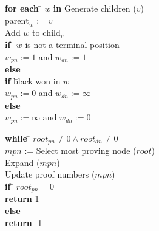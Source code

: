 \documentclass{article}
\begin{document}
\begin{samepage}
\begin{algorithm}[Expand ($v$)]
\hfill\par
\begin{tabbing}
  \textbf{for each} \= $w$ \textbf{in} Generate children ($v$)\\
  \> $\text{parent}_w$ := $v$\\
  \> Add $w$ to $\text{child}_v$\\
  \> \textbf{if} \= $w$ is not a terminal position\\
  \> \> $w_{pn} := 1$ and $w_{dn} := 1$\\
  \> \textbf{else}\\
  \> \> \textbf{if} \= black won in $w$\\
  \> \> \> $w_{pn} := 0$ and $w_{dn} := \infty$\\
  \> \> \textbf{else}\\
  \> \> \> $w_{pn} := \infty$ and $w_{dn} := 0$\\
\end{tabbing}
\end{algorithm}
\end{samepage}

\begin{samepage}
\begin{algorithm}
\hfill\par
\begin{tabbing}
  \textbf{while} \= $root_{pn} \not= 0 \land root_{dn} \not= 0$\\
  \> $mpn$ := Select most proving node ($root$) \\
  \> Expand ($mpn$)\\
  \> Update proof numbers ($mpn$)\\
  \textbf{if} \= $root_{pn} = 0$\\
  \> \textbf{return} 1\\
  \textbf{else}\\
  \> \textbf{return} -1\\
\end{tabbing}
\end{algorithm}
\end{samepage}
\end{document}
